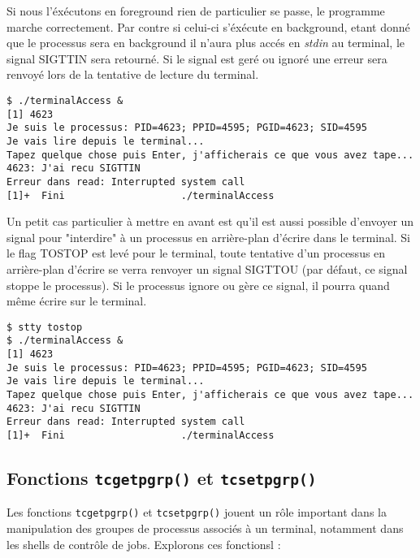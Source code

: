 Si nous l'éxécutons en foreground rien de particulier se passe, le programme marche correctement. Par contre si celui-ci s'éxécute en background, etant donné que
le processus sera en background il n'aura plus accés en \textit{stdin} au terminal, le signal SIGTTIN sera retourné.
Si le signal est geré ou ignoré une erreur sera renvoyé lors de la tentative de lecture du terminal.

\begin{lstlisting}[style=blackstyle]
$ ./terminalAccess &
[1] 4623
Je suis le processus: PID=4623; PPID=4595; PGID=4623; SID=4595
Je vais lire depuis le terminal...
Tapez quelque chose puis Enter, j'afficherais ce que vous avez tape...
4623: J'ai recu SIGTTIN
Erreur dans read: Interrupted system call
[1]+  Fini                    ./terminalAccess
\end{lstlisting}

Un petit cas particulier à mettre en avant est qu'il est aussi possible d'envoyer un signal pour "interdire" à un processus en arrière-plan d'écrire dans le terminal. Si le flag TOSTOP est levé pour le terminal, 
toute tentative d'un processus en arrière-plan d'écrire se verra renvoyer un signal SIGTTOU (par défaut, ce signal stoppe le processus). Si le processus ignore ou gère ce signal, il pourra quand 
même écrire sur le terminal.

\begin{lstlisting}[style=blackstyle]
$ stty tostop
$ ./terminalAccess &
[1] 4623
Je suis le processus: PID=4623; PPID=4595; PGID=4623; SID=4595
Je vais lire depuis le terminal...
Tapez quelque chose puis Enter, j'afficherais ce que vous avez tape...
4623: J'ai recu SIGTTIN
Erreur dans read: Interrupted system call
[1]+  Fini                    ./terminalAccess
\end{lstlisting}

\subsection{Fonctions \texttt{tcgetpgrp()} et \texttt{tcsetpgrp()}}

Les fonctions \texttt{tcgetpgrp()} et \texttt{tcsetpgrp()} jouent un rôle important dans la manipulation des groupes de processus associés à un terminal, notamment dans les shells de contrôle de jobs. Explorons ces fonctionsl :

